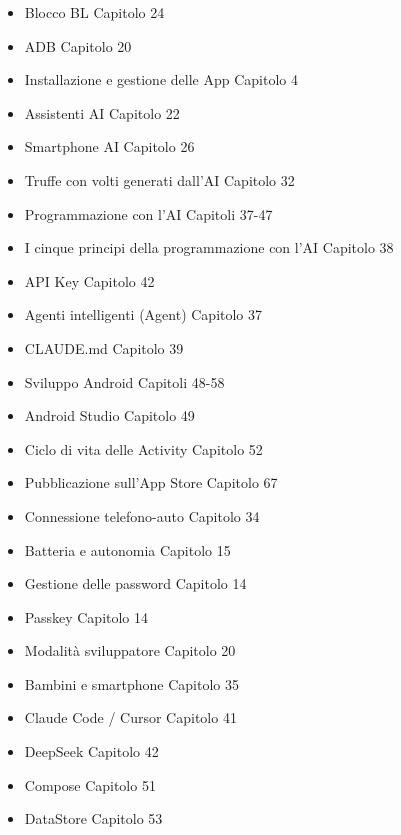 


\begin{itemize}
  \item Blocco BL Capitolo 24
  \item ADB Capitolo 20
  \item Installazione e gestione delle App Capitolo 4
  \item Assistenti AI Capitolo 22
  \item Smartphone AI Capitolo 26
  \item Truffe con volti generati dall'AI Capitolo 32
  \item Programmazione con l'AI Capitoli 37-47
  \item I cinque principi della programmazione con l'AI Capitolo 38
  \item API Key Capitolo 42
  \item Agenti intelligenti (Agent) Capitolo 37
  \item CLAUDE.md Capitolo 39
  \item Sviluppo Android Capitoli 48-58
  \item Android Studio Capitolo 49
  \item Ciclo di vita delle Activity Capitolo 52
  \item Pubblicazione sull'App Store Capitolo 67
\end{itemize}


\begin{itemize}
  \item Connessione telefono-auto Capitolo 34
  \item Batteria e autonomia Capitolo 15
  \item Gestione delle password Capitolo 14
  \item Passkey Capitolo 14
  \item Modalità sviluppatore Capitolo 20
  \item Bambini e smartphone Capitolo 35
  \item Claude Code / Cursor Capitolo 41
  \item DeepSeek Capitolo 42
  \item Compose Capitolo 51
  \item DataStore Capitolo 53
\end{itemize}

